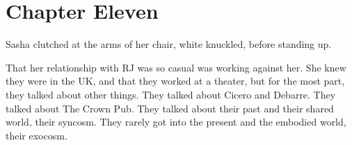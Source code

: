 \chapter*{Chapter Eleven}

Sasha clutched at the arms of her chair, white knuckled, before standing up.

That her relationship with RJ was so casual was working against her. She knew they were in the UK, and that they worked at a theater, but for the most part, they talked about other things. They talked about Cicero and Debarre. They talked about The Crown Pub. They talked about their past and their shared world, their syncosm. They rarely got into the present and the embodied world, their exocosm.
